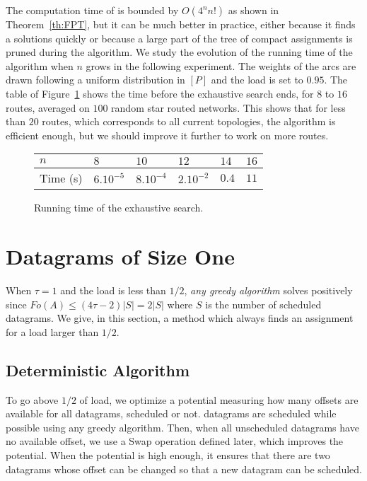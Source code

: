        The computation time of \ESCA is bounded by $O(4^nn!)$ as shown in Theorem~\ref{th:FPT}, but it can be much better in practice, either because it finds a solutions quickly or because a large part of the tree of compact assignments is pruned during the algorithm. We study the evolution of the running time  of the algorithm when $n$ grows in the following experiment. The weights of the arcs are drawn following a uniform distribution in $[P]$ and the load is set to $0.95$.  The table of Figure~\ref{fig:table} shows the time before the exhaustive search ends, for $8$ to $16$ routes, averaged on $100$ random star routed networks. This shows that for less than $20$ routes, which corresponds to all current topologies, the algorithm is efficient enough, but we should improve it further to work on more routes.
       
             \begin{figure}[h]
         \begin{center}
         \begin{tabularx}{0.9\textwidth}{|l|X|X|X|X|X|}
    \hline
   $n$ & $8$ & $10$& $12$&$14$& $16$\\
    \hline
   Time (s) & $6.10^{-5}$&$8.10^{-4}$&$2.10^{-2}$& $0.4$& $11$\\
    \hline
      \end{tabularx}
      \end{center}
      \caption{Running time of the exhaustive search.}
      \label{fig:table}
      \end{figure}



\section{Datagrams of Size One} \label{sec:small}

When $\tau = 1$ and the load is less than $1/2$, \emph{any greedy algorithm} solves \pma positively since $Fo(A) \leq (4\tau -2)|S| = 2|S|$ where $S$ is the number of scheduled datagrams. We give, in this section, a method which always finds an assignment for a load larger than $1/2$.

\subsection{Deterministic Algorithm}

To go above $1/2$ of load, we optimize a potential measuring how many offsets are available for all datagrams, scheduled or not. datagrams are scheduled while possible using any greedy algorithm. Then, when all unscheduled datagrams have no available offset, we use a Swap operation defined later, which improves the potential. When the potential is high enough, it ensures that there are two datagrams whose offset can be changed so that a new datagram can be scheduled. 

